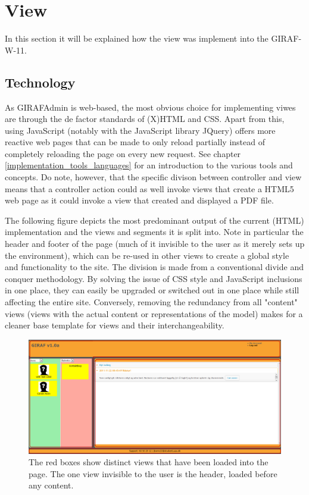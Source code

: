 \section{View}
\label{view}
In this section it will be explained how the view was implement into the GIRAF-W-11.

\subsection{Technology}
As GIRAFAdmin is web-based, the most obvious choice for implementing viwes are through the de factor standards of (X)HTML and CSS. Apart from this, using JavaScript (notably with the JavaScript library JQuery) offers more reactive web pages that can be made to only reload partially instead of completely reloading the page on every new request. See chapter \vref{implementation_tools_languages} for an introduction to the various tools and concepts. Do note, however, that the specific divison between controller and view means that a controller action could as well invoke views that create a HTML5 web page as it could invoke a view that created and displayed a PDF file.

The following figure depicts the most predominant output of the current (HTML) implementation and the views and segments it is split into. Note in particular the header and footer of the page (much of it invisible to the user as it merely sets up the environment), which can be re-used in other views to create a global style and functionality to the site. The division is made from a conventional divide and conquer methodology. By solving the issue of CSS style and JavaScript inclusions in one place, they can easily be upgraded or switched out in one place while still affecting the entire site. Conversely, removing the redundancy from all "content" views (views with the actual content or representations of the model) makes for a cleaner base template for views and their interchangeability.

\begin{figure}
    \begin{center}
    \includegraphics[scale=0.45,angle=90]{img/mvc_details/mvc_detailed_views}
    \caption{\label{implementation_view_views1}The red boxes show distinct views that have been loaded into the page. The one view invisible to the user is the header, loaded before any content.}
    \end{center}
\end{figure}


